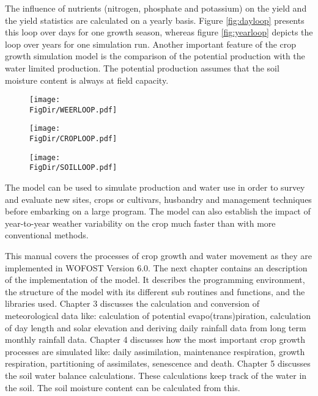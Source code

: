 The influence of nutrients (nitrogen, phosphate and potassium) on the yield and the
yield statistics are calculated on a yearly basis. 
Figure \ref{fig:dayloop} presents this loop over days for one growth season, 
whereas figure \ref{fig:yearloop} depicts the loop over years for one simulation run.
Another important feature of the crop growth simulation model is the comparison of
the potential production with the water limited production. The potential production
assumes that the soil moisture content is always at field capacity.

\begin{figure}[htbp]
\centering
\texttt{[image: \\FigDir/WEERLOOP.pdf]}
\end{figure}

\begin{figure}[htbp]
\centering
\texttt{[image: \\FigDir/CROPLOOP.pdf]}
\end{figure}

\begin{figure}[htbp]
\centering
\texttt{[image: \\FigDir/SOILLOOP.pdf]}
\end{figure}

The model can be used to simulate production and water use in order to survey
and evaluate new sites, crops or cultivars, husbandry and management techniques 
before embarking on a large
program. The model can also establish the impact of year-to-year weather variability
on the crop much faster than with more conventional methods. 

This manual covers the processes of crop growth and water movement as they are
implement\-ed in WOFOST Version 6.0. 
The next chapter contains an description of the implementation of the model. It
describes the programming environment, the structure of the model with its different
sub routines and functions, and the libraries used.
Chapter 3 discusses the calculation and conversion of meteorological data like:
calculation of potential evapo(trans)piration, calculation of day length and solar
elevation and deriving daily rainfall data from long term monthly rainfall data.
Chapter 4 discusses how the most important crop growth processes are simulated
like: daily assimilation, maintenance respiration, growth respiration, partitioning of
assimilates, senes\-cence and death. Chapter 5 discusses the soil water balance
calculations. These calculations keep track of the water in the soil. The soil moisture
content can be calculated from this. 

